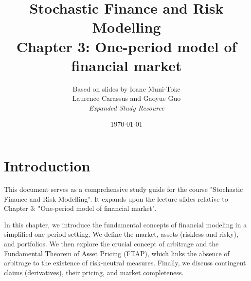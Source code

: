 \documentclass[12pt, a4paper]{report}
\title{\textbf{Stochastic Finance and Risk Modelling} \\ \large Chapter 3: One-period model of financial market}
\author{Based on slides by Ioane Muni-Toke \\ Laurence Carassus and Gaoyue Guo \\ \textit{Expanded Study Resource}}
\date{\today}
\theoremstyle{definition}
\begin{document}
\maketitle

\tableofcontents

\chapter*{Introduction}
This document serves as a comprehensive study guide for the course "Stochastic Finance and Risk Modelling". It expands upon the lecture slides relative to Chapter 3: "One-period model of financial market".

In this chapter, we introduce the fundamental concepts of financial modeling in a simplified one-period setting. We define the market, assets (riskless and risky), and portfolios. We then explore the crucial concept of arbitrage and the Fundamental Theorem of Asset Pricing (FTAP), which links the absence of arbitrage to the existence of risk-neutral measures. Finally, we discuss contingent claims (derivatives), their pricing, and market completeness.





\end{document}
